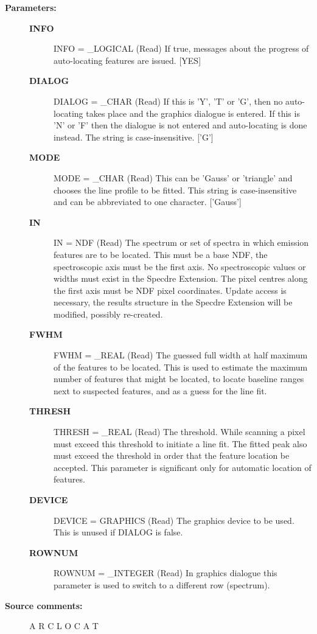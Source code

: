 \begin{description}
\item [\textbf{Parameters:}]
\begin{description}
\item [\textbf{INFO}]
INFO = \_LOGICAL (Read)
   If true, messages about the progress of auto-locating features
   are issued. [YES]
\item [\textbf{DIALOG}]
DIALOG = \_CHAR (Read)
   If this is 'Y', 'T' or 'G', then no auto-locating takes place
   and the graphics dialogue is entered. If this is 'N' or 'F'
   then the dialogue is not entered and auto-locating is done
   instead. The string is case-insensitive.  ['G']
\item [\textbf{MODE}]
MODE = \_CHAR (Read)
   This can be 'Gauss' or 'triangle' and chooses the line profile
   to be fitted. This string is case-insensitive and can be
   abbreviated to one character. ['Gauss']
\item [\textbf{IN}]
IN = NDF (Read)
   The spectrum or set of spectra in which emission features are
   to be located. This must be a base NDF, the spectroscopic axis
   must be the first axis. No spectroscopic values or widths must
   exist in the Specdre Extension. The pixel centres along the
   first axis must be NDF pixel coordinates. Update access is
   necessary, the results structure in the Specdre Extension will
   be modified, possibly re-created.
\item [\textbf{FWHM}]
FWHM = \_REAL (Read)
   The guessed full width at half maximum of the features to be
   located. This is used to estimate the maximum number of
   features that might be located, to locate baseline ranges next
   to suspected features, and as a guess for the line fit.
\item [\textbf{THRESH}]
THRESH = \_REAL (Read)
   The threshold. While scanning a pixel must exceed this
   threshold to initiate a line fit. The fitted peak also must
   exceed the threshold in order that the feature location be
   accepted. This parameter is significant only for automatic
   location of features.
\item [\textbf{DEVICE}]
DEVICE = GRAPHICS (Read)
   The graphics device to be used. This is unused if DIALOG is
   false.
\item [\textbf{ROWNUM}]
ROWNUM = \_INTEGER (Read)
   In graphics dialogue this parameter is used to switch to a
   different row (spectrum).

\end{description}

\item [\textbf{Source comments:}]
\begin{terminalv}
   A R C L O C A T


\end{terminalv}
\end{description}

